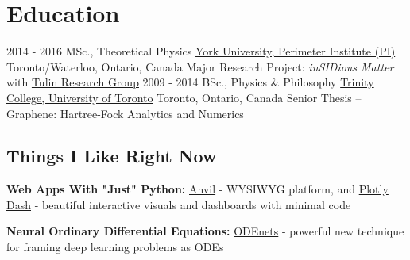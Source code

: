 \documentclass[letterpaper]{twentysecondcv} %
\begin{document}

\section{Education}

\begin{twenty} %
	\twentyitem
    	{2014 - 2016}
        {MSc., Theoretical Physics}
        {\href{http://www.yorku.ca/}{York University, Perimeter Institute (PI)}}
        {Toronto/Waterloo, Ontario, Canada}
        {}
        {Major Research Project: \emph{inSIDious Matter} with \href{http://www.yorku.ca/stulin/research.html}{Tulin Research Group}}
	\twentyitem
    	{2009 - 2014}
        {BSc., Physics \& Philosophy}
        {\href{https://www.utoronto.ca/}{Trinity College, University of Toronto}}
        {Toronto, Ontario, Canada}
        {}
        {Senior Thesis -- Graphene: Hartree-Fock Analytics and Numerics}
\end{twenty}

\subsection{Things I Like Right Now}
\textbf{Web Apps With "Just" Python:} \href{https://anvil.works/}{Anvil} - WYSIWYG platform, and \href{https://dash.plot.ly/}{Plotly Dash} - beautiful interactive visuals and dashboards with minimal code

\textbf{Neural Ordinary Differential Equations:} \href{https://arxiv.org/abs/1806.07366}{ODEnets} - powerful new technique for framing deep learning problems as ODEs
\end{document}
